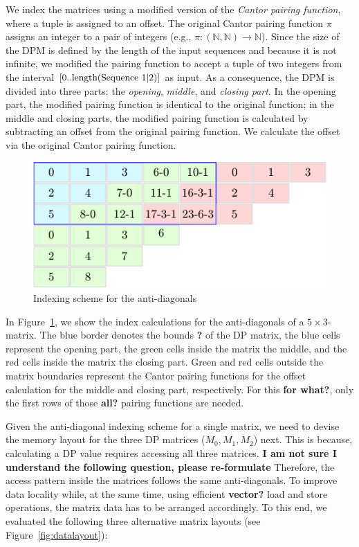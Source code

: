 \documentclass[runningheads,a4paper]{llncs}
\begin{document}
We index the matrices using a modified version of the \textit{Cantor pairing function}, where a tuple is assigned to an offset. 
The original Cantor pairing function $\pi$ assigns an integer to a pair of integers (e.g., $\pi: (\mathbb{N}, \mathbb{N}) \rightarrow \mathbb{N}$). 
Since the size of the DPM is defined by the length of the input sequences and because it is not infinite, 
we modified the pairing function to accept a tuple of two integers from the interval $[0..\textrm{length}(\textrm{Sequence 1\textbar2})]$ as input. 
As a consequence, the DPM is divided into three parts: the \emph{opening}, \emph{middle}, and \emph{closing part}. 
In the opening part, the modified pairing function is identical to the original function; in the middle and closing parts, 
the modified pairing function is calculated by subtracting an offset from the original pairing function. 
We calculate the offset via the original Cantor pairing function.

\begin{figure}[ht!]
  \centering
  \includegraphics[scale=0.9]{figures/pairingfunc.pdf}
  \caption{Indexing scheme for the anti-diagonals}
  \label{fig:pairingfunc}
\end{figure}

In Figure~\ref{fig:pairingfunc}, we show the index calculations for the anti-diagonals of a $5\times3$-matrix. 
The blue border denotes the bounds {\bf ?} of the DP matrix, the blue cells represent the opening part, 
the green cells inside the matrix the middle, and the red cells inside the matrix the closing part. 
Green and red cells outside the matrix boundaries represent the Cantor pairing functions for the offset calculation for the middle and closing part, respectively. 
For this {\bf for what?}, only the first rows of those {\bf all?} pairing functions are needed. 

Given the anti-diagonal indexing scheme for a single matrix, we need to 
devise the memory layout for the three DP matrices ($M_0,M_1,M_2$) next.  
This is because, calculating a DP value requires 
accessing all three matrices.  
{\bf I am not sure I understand the following question, please re-formulate} Therefore, the access pattern inside the matrices follows the same anti-diagonals.  
To improve data locality while, at the same time, using efficient {\bf vector?} load and store operations, 
the matrix data has to be arranged accordingly.  
To this end, we evaluated the following three alternative matrix layouts (see Figure~\ref{fig:datalayout}):
\end{document}
